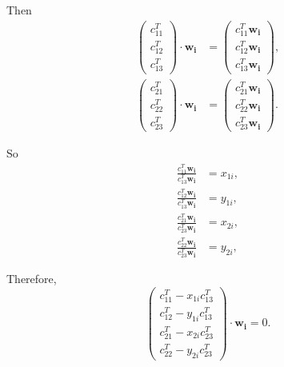 \documentclass[
  course = {{16-720B Computer Vision}},
  quartile = {{1}},
  assignment = 5\ -\ 3D\ Reconstruction\ \&\ Photometric\ Stereo,
  name = {{Kangle Deng}},
  email = {{kangled@andrew.cmu.edu}},
  firstexercise = 1
]{aga-homework}
\begin{document}
Then
\begin{equation*}
    \begin{aligned}
          \left(\begin{array}{c}
         c_{11}^T \\
         c_{12}^T \\
         c_{13}^T
    \end{array}\right) \cdot \mathbf{w_i} & = \left(\begin{array}{c}
         c_{11}^T\mathbf{w_i} \\
         c_{12}^T\mathbf{w_i} \\
         c_{13}^T\mathbf{w_i}
    \end{array}\right), \\
        \left(\begin{array}{c}
         c_{21}^T \\
         c_{22}^T \\
         c_{23}^T
    \end{array}\right) \cdot \mathbf{w_i} & = 
    \left(\begin{array}{c}
         c_{21}^T\mathbf{w_i} \\
         c_{22}^T\mathbf{w_i} \\
         c_{23}^T\mathbf{w_i}
    \end{array}\right).
    \end{aligned}

\end{equation*}

So
\begin{equation*}
    \begin{aligned}
          \frac{c_{11}^T\mathbf{w_i}}{c_{13}^T\mathbf{w_i}} & = x_{1i}, \\
          \frac{c_{12}^T\mathbf{w_i}}{c_{13}^T\mathbf{w_i}} & = y_{1i}, \\
          \frac{c_{21}^T\mathbf{w_i}}{c_{23}^T\mathbf{w_i}} & = x_{2i}, \\
          \frac{c_{22}^T\mathbf{w_i}}{c_{23}^T\mathbf{w_i}} & = y_{2i}, 
    \end{aligned}
\end{equation*}

Therefore,
\begin{equation*}
    \left(\begin{array}{c}
         c_{11}^T - x_{1i} c_{13}^T  \\
         c_{12}^T - y_{1i} c_{13}^T  \\
         c_{21}^T - x_{2i} c_{23}^T  \\
         c_{22}^T - y_{2i} c_{23}^T  
    \end{array}
    \right) \cdot \mathbf{w_i} = 0.
\end{equation*}
\end{document}
